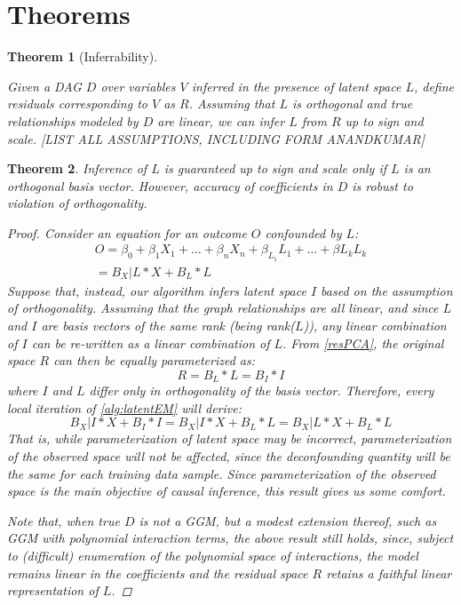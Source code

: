 \documentclass[letterpaper]{article}
\newtheorem{theorem}{Theorem}[section]
\begin{document}
\section{Theorems}
\begin{theorem}[Inferrability]
\label{inferrability}

Given a DAG $D$ over variables $V$ inferred in the presence of latent space $L$, define residuals corresponding to $V$ as $R$. Assuming that $L$ is orthogonal and true relationships modeled by $D$ are linear, we can infer $L$ from $R$ up to sign and scale.  [LIST ALL ASSUMPTIONS, INCLUDING FORM ANANDKUMAR] 
\end{theorem}
\begin{theorem}
\label{deconfounding}
Inference of $L$ is guaranteed up to sign and scale only if $L$ is an orthogonal basis vector.  However, accuracy of coefficients in $D$ is robust to violation of orthogonality.
\begin{proof}
Consider an equation for an outcome $O$ confounded by $L$:
\begin{equation}
\begin{split}
O = \beta_{0} + \beta_{1} X_1 + \ldots +\beta_{n} X_n + \beta_{L_1} L_1 + \ldots + \beta{L_k} L_k \\= B_X|L * X + B_L * L
\end{split}
\label{eq:confNonOrth}
\end{equation}
Suppose that, instead, our algorithm infers latent space $I$ based on the assumption of orthogonality.  Assuming that the graph relationships are all linear, and since $L$ and $I$ are basis vectors of the same rank (being rank($L$)), any linear combination of $I$ can be re-written as a linear combination of $L$.  From \ref{resPCA}, the original space $R$ can then be equally parameterized as:
\begin{equation}
R = B_L * L = B_I * I
\end{equation}
where $I$ and $L$ differ only in orthogonality of the basis vector.   Therefore, every local iteration of \ref{alg:latentEM} will derive:
\begin{equation}
B_X|I * X + B_I * I = B_X|I * X  + B_L * L = B_X|L * X + B_L * L
\end{equation}
That is, while parameterization of latent space may be incorrect, parameterization of the observed space will not be affected, since the deconfounding quantity will be the same for each training data sample.  Since parameterization of the observed space is the main objective of causal inference, this result gives us some comfort.  

Note that, when true $D$ is not a GGM, but a modest extension thereof, such as GGM with polynomial interaction terms, the above result still holds, since, subject to (difficult) enumeration of the polynomial space of interactions, the model remains linear in the coefficients and the residual space $R$ retains a faithful linear representation of $L$.
\end{proof}
\end{theorem}
\end{document}
